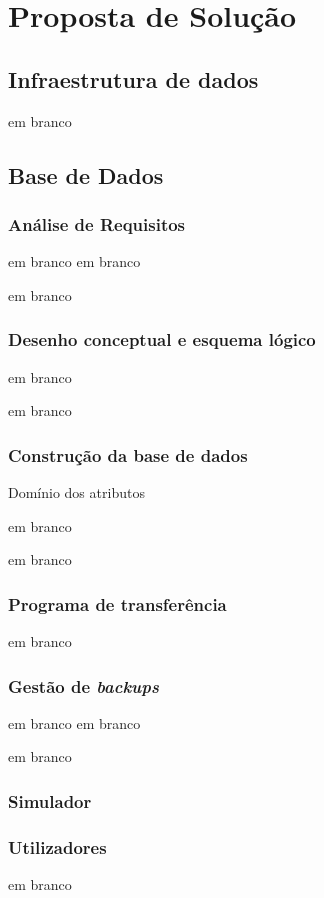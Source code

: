 \documentclass[11pt,twoside,a4paper]{report}
\begin{document}
\cleardoublepage
\chapter{Proposta de Solução}
\section{Infraestrutura de dados}
\newpage
em branco

\section{Base de Dados}
\subsection{Análise de Requisitos}
\newpage
em branco
\newpage
em branco

\newpage
em branco
\subsection{Desenho conceptual e esquema lógico}
\newpage
em branco

\newpage
em branco
\subsection{Construção da base de dados}
\begin{table}
	\caption{Domínio dos atributos}
\end{table}
\newpage
em branco

\newpage
em branco
\subsection{Programa de transferência}

\newpage
em branco
\subsection{Gestão de \textit{backups}}
\label{subchap:backups}
\newpage
em branco
\newpage
em branco

\newpage
em branco
\subsection{Simulador}

\subsection{Utilizadores}
\newpage
em branco
\end{document}
